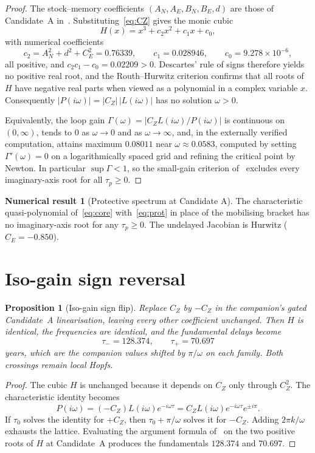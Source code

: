 \documentclass[11pt]{article}
\newtheorem{proposition}{Proposition}
\theoremstyle{definition}
\newtheorem{numresult}{Numerical result}
\begin{document}
\begin{proof}
The stock--memory coefficients $(A_N,A_E,B_N,B_E,d)$ are those of Candidate~A in~\cite{paperI}. Substituting~\eqref{eq:CZ} gives the monic cubic
\[
H(x)=x^3+c_2 x^2+c_1 x+c_0,
\]
with numerical coefficients
\[
c_2=A_N^2+d^2+C_E^2=0.76339,\qquad
c_1=0.028946,\qquad
c_0=9.278\times 10^{-6},
\]
all positive, and $c_2 c_1-c_0=0.02209>0$. Descartes' rule of signs therefore yields no positive real root, and the Routh--Hurwitz criterion confirms that all roots of $H$ have negative real parts when viewed as a polynomial in a complex variable $x$. Consequently $|P(i\omega)|=|C_Z|\,|L(i\omega)|$ has no solution $\omega>0$.

Equivalently, the loop gain $\Gamma(\omega)=|C_Z L(i\omega)/P(i\omega)|$ is continuous on $(0,\infty)$, tends to $0$ as $\omega\to 0$ and as $\omega\to\infty$, and, in the externally verified computation, attains maximum $0.08011$ near $\omega\approx 0.0583$, computed by setting $\Gamma'(\omega)=0$ on a logarithmically spaced grid and refining the critical point by Newton. In particular $\sup\Gamma<1$, so the small-gain criterion of~\cite{paperI} excludes every imaginary-axis root for all $\tau_p\ge 0$.
\end{proof}

\begin{numresult}[Protective spectrum at Candidate A]
\label{num:prot}
The characteristic quasi-polynomial of~\eqref{eq:core} with~\eqref{eq:prot} in place of the mobilising bracket has no imaginary-axis root for any $\tau_p\ge 0$. The undelayed Jacobian is Hurwitz ($C_E=-0.850$).
\end{numresult}

\section{Iso-gain sign reversal}

\begin{proposition}[Iso-gain sign flip]
\label{prop:flip}
Replace $C_Z$ by $-C_Z$ in the companion's gated Candidate~A linearisation, leaving every other coefficient unchanged. Then $H$ is identical, the frequencies are identical, and the fundamental delays become
\[
\tau_-=128.374,\qquad \tau_+=70.697
\]
years, which are the companion values shifted by $\pi/\omega$ on each family. Both crossings remain local Hopfs.
\end{proposition}

\begin{proof}
The cubic $H$ is unchanged because it depends on $C_Z$ only through $C_Z^2$. The characteristic identity becomes
\[
P(i\omega)=(-C_Z)L(i\omega)e^{-i\omega\tau}
=C_Z L(i\omega)e^{-i\omega\tau}e^{\pm i\pi}.
\]
If $\tau_0$ solves the identity for $+C_Z$, then $\tau_0+\pi/\omega$ solves it for $-C_Z$. Adding $2\pi k/\omega$ exhausts the lattice. Evaluating the argument formula of~\cite{paperI} on the two positive roots of $H$ at Candidate~A produces the fundamentals $128.374$ and $70.697$.
\end{proof}
\end{document}
